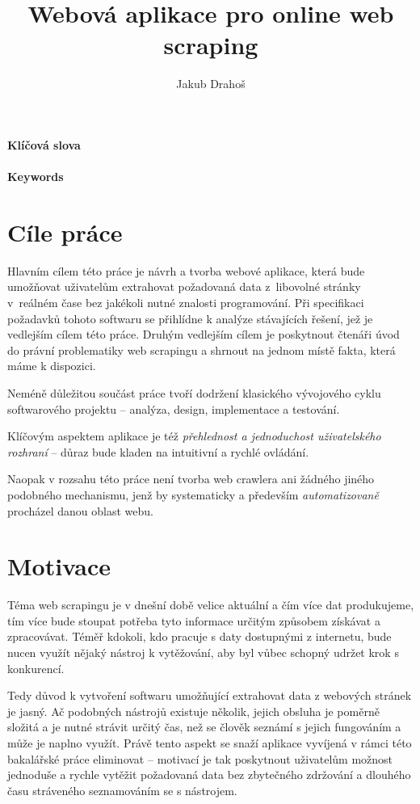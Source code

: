 \documentclass[thesis=B,czech]{FITthesis2}[2012/06/26]
\title{Webová aplikace pro online web scraping}
\author{Jakub Drahoš} %
\begin{document}
	
	
	\begin{introduction}
		\paragraph*{Klíčová slova} \thekeywordscs{}
		\paragraph*{Keywords} \thekeywordsen{}
		
		\section*{Cíle práce}
		Hlavním cílem této práce je návrh a tvorba webové aplikace, která bude umožňovat uživatelům extrahovat požadovaná data z~libovolné stránky v~reálném čase bez jakékoli nutné znalosti programování. Při specifikaci požadavků tohoto softwaru se přihlídne k analýze stávajících řešení, jež je vedlejším cílem této práce. Druhým vedlejším cílem je poskytnout čtenáři úvod do právní problematiky web scrapingu a shrnout na jednom místě fakta, která máme k dispozici.
		
		Neméně důležitou součást práce tvoří dodržení klasického vývojového cyklu softwarového projektu -- analýza, design, implementace a testování.
		
		Klíčovým aspektem aplikace je též \emph{přehlednost a jednoduchost uživatelského rozhraní} -- důraz bude kladen na intuitivní a rychlé ovládání.
		
		Naopak v rozsahu této práce není tvorba web crawlera ani žádného jiného podobného mechanismu, jenž by systematicky a především \emph{automatizovaně} procházel danou oblast webu.
		
		\section*{Motivace}
		Téma web scrapingu je v dnešní době velice aktuální a čím více dat produkujeme, tím více bude stoupat potřeba tyto informace určitým způsobem získávat a zpracovávat. Téměř kdokoli, kdo pracuje s daty dostupnými z internetu, bude nucen využít nějaký nástroj k vytěžování, aby byl vůbec schopný udržet krok s konkurencí.
		
		Tedy důvod k vytvoření softwaru umožňující extrahovat data z webových stránek je jasný. Ač podobných nástrojů existuje několik, jejich obsluha je poměrně složitá a je nutné strávit určitý čas, než se člověk seznámí s jejich fungováním a může je naplno využít. Právě tento aspekt se snaží aplikace vyvíjená v rámci této bakalářské práce eliminovat -- motivací je tak poskytnout uživatelům možnost jednoduše a rychle vytěžit požadovaná data bez zbytečného zdržování a dlouhého času stráveného seznamováním se s nástrojem.
		

\end{introduction}
\end{document}
